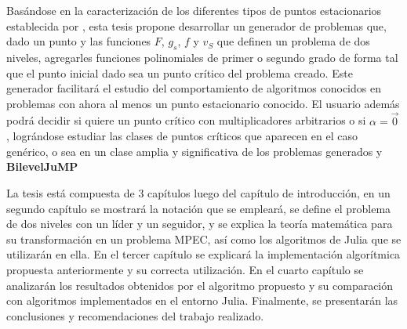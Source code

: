 Basándose en la caracterización de los diferentes tipos de puntos estacionarios establecida por \cite{Flegel2003AFJ}, esta tesis propone desarrollar un generador de problemas que, dado un punto y las funciones $F$, $g_s$, $f$ y $v_S$  que definen un problema de dos niveles, agregarles funciones polinomiales de primer o segundo grado de forma tal que el punto inicial dado sea un punto crítico del problema creado. 
Este generador facilitará el estudio del comportamiento de algoritmos conocidos en problemas con ahora al menos un punto estacionario conocido.
El usuario además podrá decidir si quiere un punto crítico con multiplicadores arbitrarios o si $\alpha = \vec{0}$, lográndose estudiar las clases de puntos críticos que aparecen en el caso genérico, o sea en un clase amplia y significativa de los problemas generados y \textbf{BilevelJuMP}



La tesis está compuesta de 3 capítulos luego del capítulo de introducción, en un segundo capítulo 
se mostrará la notación que se empleará, se define el problema de dos niveles con un líder y un seguidor, y se explica la teoría matemática para su transformación en un problema MPEC, así como los algoritmos de Julia que se utilizarán en ella.
En el tercer capítulo se explicará la implementación algorítmica propuesta anteriormente y su correcta utilización. 
En el cuarto capítulo se analizarán los resultados obtenidos por el algoritmo propuesto y su comparación con algoritmos implementados en el entorno Julia.
Finalmente, se presentarán las conclusiones y recomendaciones del trabajo realizado.